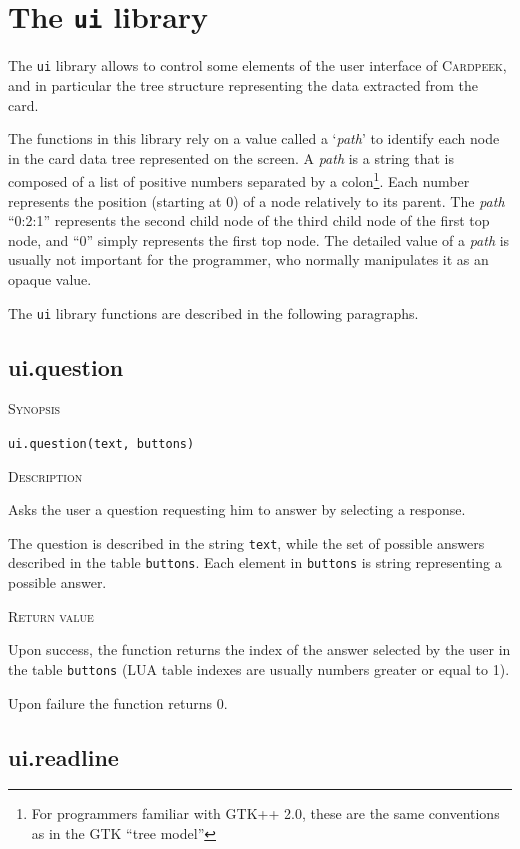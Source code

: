 \documentclass[11pt]{report}
\newcommand{\mansection}[1]{\vspace{0.5em}\par\noindent\textsc{#1}\vspace{0.5em}\par}
\newcommand{\syn}[1]{\texttt{#1}}
\newcommand{\Cardpeek}{\textsc{Cardpeek}}
\begin{document}
\section{The \syn{ui} library}

The \syn{ui} library allows to control some elements of the user interface of 
\Cardpeek, and in particular the tree structure representing the data 
extracted from the card.

The functions in this library rely on a value called a `\emph{path}' to identify 
each node in the card data tree represented on the screen.
A \emph{path} is a string that is composed of a list of positive numbers separated 
by a colon\footnote{For programmers familiar with GTK++ 2.0, these are the same 
conventions as in the GTK ``tree model''}. 
Each number represents the position (starting at 0) of a node relatively to its parent.
The \emph{path} ``0:2:1'' represents the second child node of the third child 
node of the first top node, and ``0'' simply represents the first top node.
The detailed value of a \emph{path} is usually not important for the programmer, 
who normally manipulates it as an opaque value. 

The \syn{ui} library functions are described in the following paragraphs.


\subsection{ui.question}

\mansection{Synopsis}
\syn{ui.question(text, buttons)}

\mansection{Description}
  Asks the user a question requesting him to answer by selecting a response.

  The question is described in the string \syn{text}, while the set of 
  possible answers described in the table \syn{buttons}. 
  Each element in \syn{buttons} is string representing a possible answer.
  
\mansection{Return value}
  Upon success, the function returns the index of the answer selected by the 
  user in the table \syn{buttons} 
  (LUA table indexes are usually numbers greater or equal to 1). 
  
  Upon failure the function returns 0.


\subsection{ui.readline}
\end{document}
